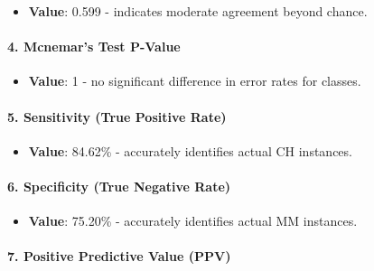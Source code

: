 \documentclass[
]{article}
\providecommand{\tightlist}{%
  \setlength{\itemsep}{0pt}\setlength{\parskip}{0pt}}
\begin{document}
\begin{itemize}
\tightlist
\item
  \textbf{Value}: 0.599 - indicates moderate agreement beyond chance.
\end{itemize}

\hypertarget{mcnemars-test-p-value-1}{%
\paragraph{\texorpdfstring{4. \textbf{Mcnemar's Test
P-Value}}{4. Mcnemar's Test P-Value}}\label{mcnemars-test-p-value-1}}

\begin{itemize}
\tightlist
\item
  \textbf{Value}: 1 - no significant difference in error rates for
  classes.
\end{itemize}

\hypertarget{sensitivity-true-positive-rate-1}{%
\paragraph{\texorpdfstring{5. \textbf{Sensitivity (True Positive
Rate)}}{5. Sensitivity (True Positive Rate)}}\label{sensitivity-true-positive-rate-1}}

\begin{itemize}
\tightlist
\item
  \textbf{Value}: 84.62\% - accurately identifies actual CH instances.
\end{itemize}

\hypertarget{specificity-true-negative-rate-1}{%
\paragraph{\texorpdfstring{6. \textbf{Specificity (True Negative
Rate)}}{6. Specificity (True Negative Rate)}}\label{specificity-true-negative-rate-1}}

\begin{itemize}
\tightlist
\item
  \textbf{Value}: 75.20\% - accurately identifies actual MM instances.
\end{itemize}

\hypertarget{positive-predictive-value-ppv-1}{%
\paragraph{\texorpdfstring{7. \textbf{Positive Predictive Value
(PPV)}}{7. Positive Predictive Value (PPV)}}\label{positive-predictive-value-ppv-1}}
\end{document}
